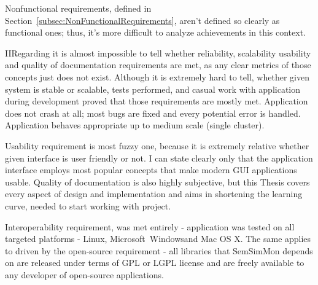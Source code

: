 Nonfunctional requirements, defined in Section~\ref{subsec:NonFunctionalRequirements}, aren\rq{}t defined so clearly as functional ones; thus, it\rq{}s more difficult to analyze achievements in this context.

IIRegarding it is almost impossible to tell whether reliability, scalability usability and quality of documentation requirements are met, as any clear metrics of those concepts just does not exist. Although it is extremely hard to tell, whether given system is stable or scalable, tests performed, and casual work with application during development proved that those requirements are mostly met. Application does not crash at all; most bugs are fixed and every potential error is handled. Application behaves appropriate up to medium scale (single cluster).

Usability requirement is most fuzzy one, because it is extremely relative whether given interface is user friendly or not. I can state clearly only that the application interface employs most popular concepts that make modern GUI applications usable. Quality of documentation is also highly subjective, but this Thesis covers every aspect of design and implementation and aims in shortening the learning curve, needed to start working with project.

Interoperability requirement, was met entirely - application was tested on all targeted platforms - Linux, Microsoft\textregistered~Windows\textregistered and Mac OS X\textregistered. The same applies to driven by the open-source requirement - all libraries that SemSimMon depends on are released under terms of GPL or LGPL license and are freely available to any developer of open-source applications.